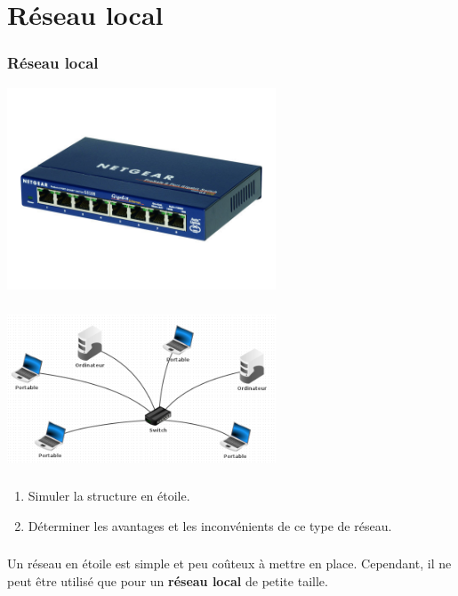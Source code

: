 \documentclass[svgnames,11pt]{beamer}
\begin{document}
\section{Réseau local}
\begin{frame}
    \frametitle{Réseau local}
\begin{center}
\centering
\includegraphics[width=8cm]{ressources/switch.jpg}
\label{IMG}
\end{center}

\end{frame}
\begin{frame}
    \frametitle{}

\begin{center}
\centering
\includegraphics[width=8cm]{ressources/local.png}
\label{IMG}
\end{center}

\end{frame}
\begin{frame}
    \frametitle{}

    \begin{activite}
    \begin{enumerate}
        \item Simuler la structure en étoile.
        \item Déterminer les avantages et les inconvénients de ce type de réseau.
    \end{enumerate}
    \end{activite}

\end{frame}
\begin{frame}
    \frametitle{}

    \begin{aretenir}[]
    Un réseau en étoile est simple et peu coûteux à mettre en place. Cependant, il ne peut être utilisé que pour un \textbf{réseau local} de petite taille.
    \end{aretenir}

\end{frame}
\end{document}
